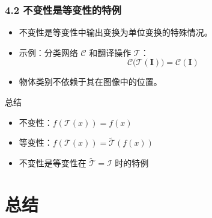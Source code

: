 \documentclass[t,aspectratio=169]{beamer} %
\begin{document}
\begin{frame}
    \frametitle{4.2 不变性是等变性的特例}
    \begin{itemize}
        \item 不变性是等变性中\alert{输出变换为单位变换}的特殊情况。
        \item 示例：分类网络 $\mathcal{C}$ 和翻译操作 $\mathcal{T}$：
        \begin{equation}
            \mathcal{C}\bigl(\mathcal{T}(\mathbf{I})\bigr) = \mathcal{C}(\mathbf{I})
            \tag{9.4}
        \end{equation}
        \item 物体类别不依赖于其在图像中的位置。
    \end{itemize}
    \begin{block}{总结}
        \begin{itemize}
            \item \alert{不变性}：$f(\mathcal{T}(x)) = f(x)$
            \item \alert{等变性}：$f(\mathcal{T}(x)) = \widetilde{\mathcal{T}}(f(x))$
            \item 不变性是等变性在 $\widetilde{\mathcal{T}} = \mathcal{I}$ 时的特例
        \end{itemize}
    \end{block}
\end{frame}

\section{总结}
\end{document}
